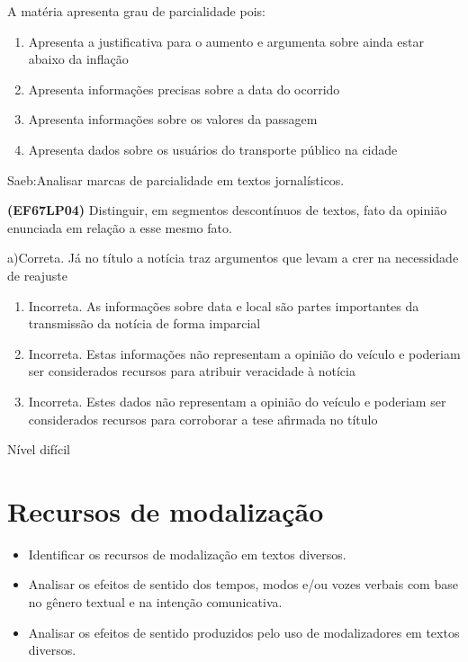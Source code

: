 A matéria apresenta grau de parcialidade pois:

\begin{enumerate}
\def\labelenumi{\alph{enumi})}
\item
  Apresenta a justificativa para o aumento e argumenta sobre ainda estar
  abaixo da inflação
\item
  Apresenta informações precisas sobre a data do ocorrido
\item
  Apresenta informações sobre os valores da passagem
\item
  Apresenta dados sobre os usuários do transporte público na cidade
\end{enumerate}

Saeb:Analisar marcas de parcialidade em textos jornalísticos.

\textbf{(EF67LP04)} Distinguir, em segmentos descontínuos de textos,
fato da opinião enunciada em relação a esse mesmo fato.

a)Correta. Já no título a notícia traz argumentos que levam a crer na
necessidade de reajuste

\begin{enumerate}
\def\labelenumi{\arabic{enumi}.}
\item
  Incorreta. As informações sobre data e local são partes importantes da
  transmissão da notícia de forma imparcial
\item
  Incorreta. Estas informações não representam a opinião do veículo e
  poderiam ser considerados recursos para atribuir veracidade à notícia
\item
  Incorreta. Estes dados não representam a opinião do veículo e poderiam
  ser considerados recursos para corroborar a tese afirmada no título
\end{enumerate}

Nível difícil

\chapter{Recursos de modalização}


\begin{itemize}

  \item Identificar os recursos de modalização em textos diversos.

  \item Analisar os efeitos de sentido dos tempos, modos e/ou vozes 
verbais com base no gênero textual e na intenção comunicativa.

  \item Analisar os efeitos de sentido produzidos pelo uso de modalizadores em textos diversos.

\end{itemize}

